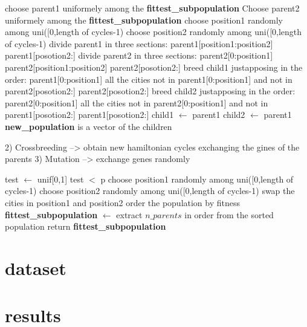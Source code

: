 \documentclass{article}
\begin{document}
\begin{algorithm}
    \begin{algorithmic}[1]
  			\State choose parent1 uniformely among the \textbf{fittest\_subpopulation}
  			\State Choose parent2 uniformely among the \textbf{fittest\_subpopulation}
  				\State choose position1 randomly among uni([0,length of cycles-1)
  				\State choose position2 randomly among uni([0,length of cycles-1)
  				\State divide parent1 in three sections: 
  				\State parent1[position1:position2]
  				\State parent1[posotion2:]
  				\State divide parent2 in three sections:
  				\State parent2[0:position1] 
  				\State parent2[position1:position2]
  				\State parent2[posotion2:]
  				\State breed child1 justapposing in the order:
  				\State parent1[0:position1]
  				\State all the cities not in  parent1[0:position1] and not in parent2[posotion2:]
  				\State parent2[posotion2:]
  				\State breed child2 justapposing in the order:
  				\State parent2[0:position1]
  				\State all the cities not in  parent2[0:position1] and not in parent1[posotion2:]
  				\State parent1[posotion2:]
  			\Else
  				\State child1 $\leftarrow$ parent1
  				\State child2 $\leftarrow$ parent1
  			\EndIf
      	\EndFor
        \State \textbf{new\_population} is a vector of the children 
       \EndFunction
\end{algorithmic}
\end{algorithm}
2) Crossbreeding --> obtain new hamiltonian cycles exchanging the gines of the parents
3) Mutation --> exchange genes randomly
\begin{algorithm}[h]
    \begin{algorithmic}[1]
        \State test $\leftarrow$ unif[0,1]
        \If test $<$ p
        	\State choose position1 randomly among uni([0,length of cycles-1)
  			\State choose position2 randomly among uni([0,length of cycles-1)
  			\State swap the cities in position1 and position2
        \EndIf
        \State order the population by fitness
        \State \textbf{fittest\_subpopulation} $\leftarrow$ extract $n\_parents$ in order from the sorted population
        \State return \textbf{fittest\_subpopulation}
       \EndFunction
\end{algorithmic}
\end{algorithm}
\section{dataset}

\section{results}
\end{document}

